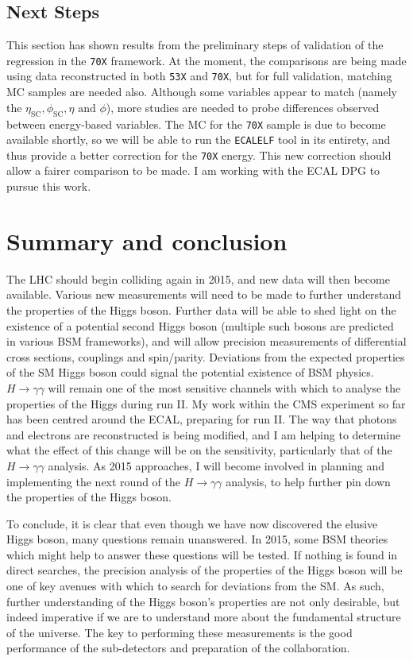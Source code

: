 \documentclass[10pt]{article}
\begin{document}
\subsection{Next Steps}

This section has shown results from the preliminary steps of validation of the regression in the \texttt{70X} framework. At the moment, the comparisons are being made using data reconstructed in both \texttt{53X} and \texttt{70X}, but for full validation, matching MC samples are needed also. Although some variables appear to match (namely the $\eta_{\text{SC}},\phi_{\text{SC}},\eta \text{ and }\phi$), more studies are needed to probe differences observed between energy-based variables. The MC for the \texttt{70X} sample is due to become available shortly, so we will be able to run the \texttt{ECALELF} tool in its entirety, and thus provide a better correction for the \texttt{70X} energy. This new correction should allow a fairer comparison to be made. I am working with the ECAL DPG to pursue this work.



\section{Summary and conclusion}
The LHC should begin colliding again in 2015, and new data will then become available. Various new measurements will need to be made to further understand the properties of the Higgs boson. Further data will be able to shed light on the existence of a potential second Higgs boson (multiple such bosons are predicted in various BSM frameworks), and will allow precision measurements of differential cross sections, couplings and spin/parity. Deviations from the expected properties of the SM Higgs boson could signal the potential existence of BSM physics.  $H\rightarrow \gamma \gamma$ will remain one of the most sensitive channels with which to analyse the properties of the Higgs during run II. My work within the CMS experiment so far has been centred around the ECAL, preparing for run II. The way that photons and electrons are reconstructed is being modified, and I am helping to determine what the effect of this change will be on the sensitivity, particularly that of the $H \rightarrow \gamma \gamma$ analysis. As 2015 approaches, I will become involved in planning and implementing the next round of the  $H \rightarrow \gamma \gamma$ analysis, to help further pin down the properties of the Higgs boson.

To conclude, it is clear that even though we have now discovered the elusive Higgs boson, many questions remain unanswered. In 2015, some BSM theories which might help to answer these questions will be tested. If nothing is found in direct searches, the precision analysis of the properties of the Higgs boson will be one of key avenues with which to search for deviations from the SM. As such, further understanding of the Higgs boson's properties are not only desirable, but indeed imperative if we are to understand more about the fundamental structure of the universe. The key to performing these measurements is the good performance of the sub-detectors and preparation of the collaboration.




\end{document}
